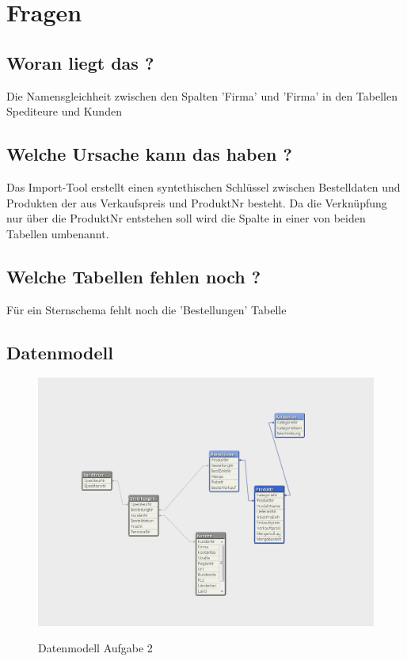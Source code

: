 \documentclass[10pt]{scrartcl}
\author{André Harms, Oliver Steenbuck}
\title{\titletext}
\date{19.11.2012}
\begin{document}
\maketitle

\setcounter{tocdepth}{3}
\tableofcontents

\section{Fragen}
\subsection{Woran liegt das ?}
Die Namensgleichheit zwischen den Spalten 'Firma' und 'Firma' in den Tabellen Spediteure und Kunden

\subsection{Welche Ursache kann das haben ?}
Das Import-Tool erstellt einen syntethischen Schlüssel zwischen Bestelldaten und Produkten der aus Verkaufspreis und ProduktNr besteht. Da die Verknüpfung nur über die ProduktNr entstehen soll wird die Spalte in einer von beiden Tabellen umbenannt.

\subsection{Welche Tabellen fehlen noch ?}
Für ein Sternschema fehlt noch die 'Bestellungen' Tabelle


\subsection{Datenmodell}
\begin{figure}[H]
\begin{turn}{0}	
	\label{pic:datenmodell}
	\includegraphics[scale=0.55]{datenmodell1.png}
	\caption{Datenmodell Aufgabe 2} 
\end{turn}
\end{figure}
\end{document}
